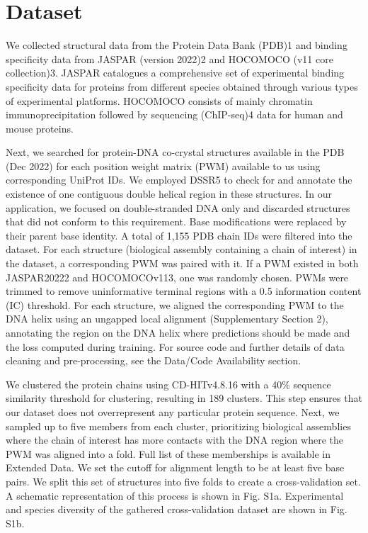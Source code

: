 \section{Dataset}
We collected structural data from the Protein Data Bank (PDB)1 and binding specificity data from JASPAR (version 2022)2  and HOCOMOCO (v11 core collection)3. JASPAR catalogues a comprehensive set of experimental binding specificity data for proteins from different species obtained through various types of experimental platforms. HOCOMOCO consists of mainly chromatin immunoprecipitation followed by sequencing (ChIP-seq)4 data for human and mouse proteins.
\par
Next, we searched for protein-DNA co-crystal structures available in the PDB (Dec 2022) for each position weight matrix (PWM) available to us using corresponding UniProt IDs. We employed DSSR5 to check for and annotate the existence of one contiguous double helical region in these structures. In our application, we focused on double-stranded DNA only and discarded structures that did not conform to this requirement. Base modifications were replaced by their parent base identity. A total of 1,155 PDB chain IDs were filtered into the dataset. For each structure (biological assembly containing a chain of interest) in the dataset, a corresponding PWM was paired with it. If a PWM existed in both JASPAR20222 and HOCOMOCOv113, one was randomly chosen. PWMs were trimmed to remove uninformative terminal regions with a 0.5 information content (IC) threshold. For each structure, we aligned the corresponding PWM to the DNA helix using an ungapped local alignment (Supplementary Section 2), annotating the region on the DNA helix where predictions should be made and the loss computed during training. For source code and further details of data cleaning and pre-processing, see the Data/Code Availability section.
\par
We clustered the protein chains using CD-HITv4.8.16 with a 40\% sequence similarity threshold for clustering, resulting in 189 clusters. This step ensures that our dataset does not overrepresent any particular protein sequence. Next, we sampled up to five members from each cluster, prioritizing biological assemblies where the chain of interest has more contacts with the DNA region where the PWM was aligned into a fold. Full list of these memberships is available in Extended Data. We set the cutoff for alignment length to be at least five base pairs. We split this set of structures into five folds to create a cross-validation set. A schematic representation of this process is shown in Fig. S1a. Experimental and species diversity of the gathered cross-validation dataset are shown in Fig. S1b.
